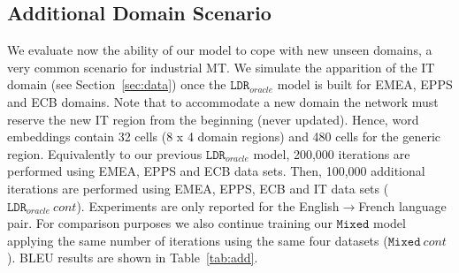 \documentclass[a4paper]{article}
\begin{document}
\begin{table}[!h]
\begin{center}
\end{center}
\caption{BPE-detokenized BLEU scores for the Transformer architecture for varying domain-specific embedding sizes \label{tab:embedding-size}}
\end{table}

\subsection{Additional Domain Scenario \label{ssec:additiona_domain}}

We evaluate now the ability of our model to cope with new unseen domains, a very common scenario for industrial MT.
We simulate the apparition of the IT domain (see Section~\ref{sec:data}) once the $\mathtt{LDR}_{oracle}$ model is built for EMEA, EPPS and ECB domains.
Note that to accommodate a new domain the network must reserve the new IT region from the beginning (never updated).
Hence, word embeddings contain 32 cells (8 x 4 domain regions) and 480 cells for the generic region.
Equivalently to our previous $\mathtt{LDR}_{oracle}$ model, 200,000 iterations are performed using EMEA, EPPS and ECB data sets.
Then, 100,000 additional iterations are performed using  EMEA, EPPS, ECB and IT data sets ($\mathtt{LDR}_{oracle}\ cont$).
Experiments are only reported for the English$\rightarrow$French language pair.
For comparison purposes we also continue training our $\mathtt{Mixed}$ model applying the same number of iterations using the same four datasets ($\mathtt{Mixed}\ cont$).
BLEU results are shown in Table~\ref{tab:add}.
\end{document}
